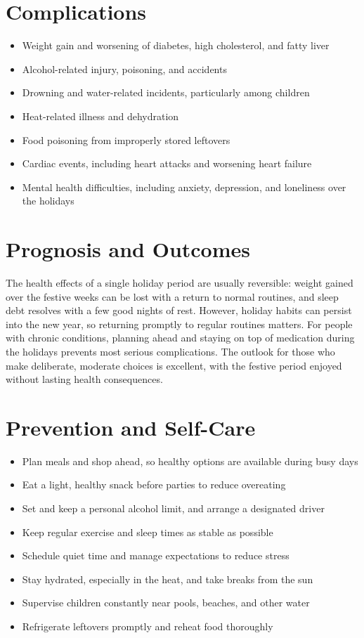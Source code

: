 \section*{Complications}
\begin{itemize}
    \item Weight gain and worsening of diabetes, high cholesterol, and fatty liver
    \item Alcohol-related injury, poisoning, and accidents
    \item Drowning and water-related incidents, particularly among children
    \item Heat-related illness and dehydration
    \item Food poisoning from improperly stored leftovers
    \item Cardiac events, including heart attacks and worsening heart failure
    \item Mental health difficulties, including anxiety, depression, and loneliness over the holidays
\end{itemize}

\section*{Prognosis and Outcomes}
The health effects of a single holiday period are usually reversible: weight gained over the festive weeks can be lost with a return to normal routines, and sleep debt resolves with a few good nights of rest. However, holiday habits can persist into the new year, so returning promptly to regular routines matters. For people with chronic conditions, planning ahead and staying on top of medication during the holidays prevents most serious complications. The outlook for those who make deliberate, moderate choices is excellent, with the festive period enjoyed without lasting health consequences.

\section*{Prevention and Self-Care}
\begin{itemize}
    \item Plan meals and shop ahead, so healthy options are available during busy days
    \item Eat a light, healthy snack before parties to reduce overeating
    \item Set and keep a personal alcohol limit, and arrange a designated driver
    \item Keep regular exercise and sleep times as stable as possible
    \item Schedule quiet time and manage expectations to reduce stress
    \item Stay hydrated, especially in the heat, and take breaks from the sun
    \item Supervise children constantly near pools, beaches, and other water
    \item Refrigerate leftovers promptly and reheat food thoroughly
\end{itemize}

